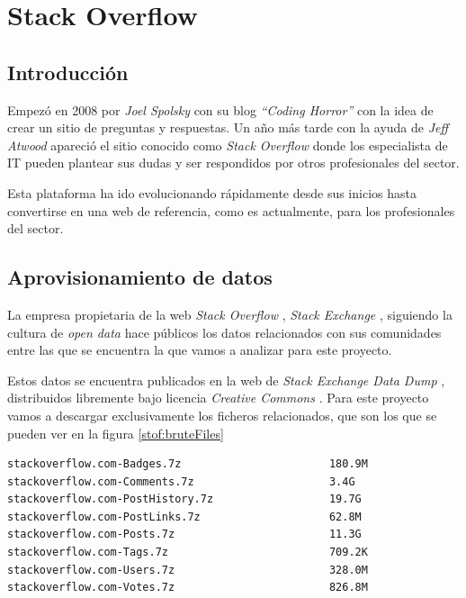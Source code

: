 \chapter{Stack Overflow \label{sec:stackoverflow}}

\section{Introducción}
Empezó en 2008 por \textit{Joel Spolsky} con su blog \textit{``Coding Horror''} con la idea de crear un sitio de preguntas y respuestas. Un año más tarde con la ayuda de \textit{Jeff Atwood} apareció el sitio conocido como \textit{Stack Overflow} \cite{stackoverflow} donde los especialista de \gls{IT} pueden plantear sus dudas y ser respondidos por otros profesionales del sector.

Esta plataforma ha ido evolucionando rápidamente desde sus inicios hasta convertirse en una web de referencia, como es actualmente, para los profesionales del sector.

\section{Aprovisionamiento de datos}

La empresa propietaria de la web \textit{Stack Overflow} \cite{stackoverflow}, \textit{Stack Exchange} \cite{stackexchange}, siguiendo la cultura de \textit{open data} \cite{opendata} hace públicos los datos relacionados con sus comunidades entre las que se encuentra la que vamos a analizar para este proyecto.

Estos datos se encuentra publicados en la web de \textit{Stack Exchange Data Dump} \cite{stofData}, distribuidos libremente bajo licencia \textit{Creative Commons} \cite{creativecommons}. Para este proyecto vamos a descargar exclusivamente los ficheros relacionados, que son los que se pueden ver en la figura \ref{stof:bruteFiles}

\clearpage
\begin{lstlisting}[label=stof:bruteFiles,frame=single,caption=Ficheros públicos sobre \textit{Stack Overflow} en la web de \textit{Data Dump}.]
stackoverflow.com-Badges.7z           			  180.9M
stackoverflow.com-Comments.7z         			  3.4G
stackoverflow.com-PostHistory.7z      			  19.7G
stackoverflow.com-PostLinks.7z        			  62.8M
stackoverflow.com-Posts.7z            			  11.3G
stackoverflow.com-Tags.7z             			  709.2K
stackoverflow.com-Users.7z            			  328.0M
stackoverflow.com-Votes.7z            			  826.8M
\end{lstlisting}

